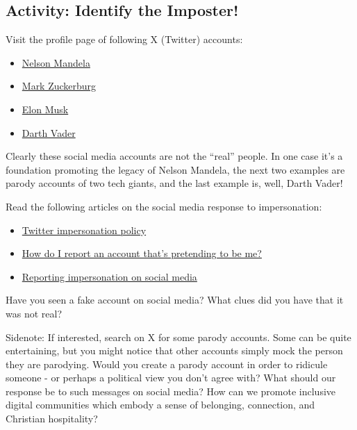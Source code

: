 \documentclass[
]{book}
\providecommand{\tightlist}{%
  \setlength{\itemsep}{0pt}\setlength{\parskip}{0pt}}
\theoremstyle{definition}
\theoremstyle{definition}
\theoremstyle{definition}
\theoremstyle{definition}
\theoremstyle{remark}
\begin{document}
\hypertarget{activity-identify-the-imposter}{%
\subsection*{Activity: Identify the Imposter!}\label{activity-identify-the-imposter}}

\begin{reflect}
Visit the profile page of following X (Twitter) accounts:

\begin{itemize}
\tightlist
\item
  \href{https://twitter.com/NelsonMandela}{Nelson Mandela}\\
\item
  \href{https://twitter.com/notzuckerberg}{Mark Zuckerburg}
\item
  \href{https://twitter.com/ElonMuskAOC}{Elon Musk}
\item
  \href{https://twitter.com/DarthVader}{Darth Vader}
\end{itemize}

Clearly these social media accounts are not the ``real'' people. In one case it's a foundation promoting the legacy of Nelson Mandela, the next two examples are parody accounts of two tech giants, and the last example is, well, Darth Vader!

Read the following articles on the social media response to impersonation:

\begin{itemize}
\tightlist
\item
  \href{https://help.twitter.com/en/rules-and-policies/x-impersonation-and-deceptive-identities-policy}{Twitter impersonation policy}
\item
  \href{https://www.facebook.com/help/174210519303259}{How do I report an account that's pretending to be me?}
\item
  \href{https://saferinternet.org.uk/blog/reporting-impersonation-on-social-media}{Reporting impersonation on social media}
\end{itemize}

Have you seen a fake account on social media? What clues did you have that it was not real?
\end{reflect}

\begin{feedback}
Sidenote: If interested, search on X for some parody accounts. Some can
be quite entertaining, but you might notice that other accounts simply
mock the person they are parodying. Would you create a parody account in
order to ridicule someone - or perhaps a political view you don't agree
with? What should our response be to such messages on social media? How
can we promote inclusive digital communities which embody a sense of
belonging, connection, and Christian hospitality?
\end{feedback}
\end{document}
